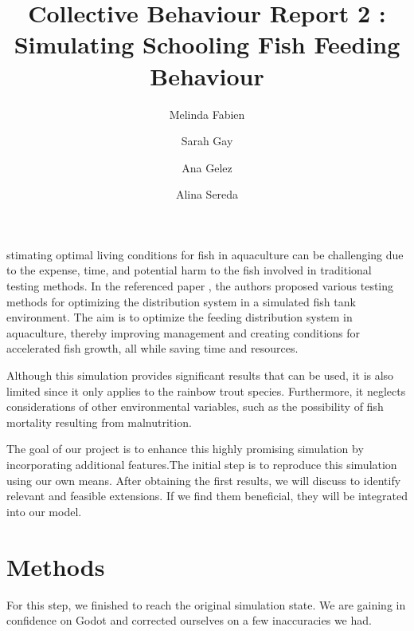 \documentclass[9pt]{pnas-new}
\title{Collective Behaviour Report 2 : Simulating Schooling Fish Feeding Behaviour}
\author{Melinda Fabien}
\author{Sarah Gay}
\author{Ana Gelez}
\author{Alina Sereda}
\affil{Collective behaviour course research seminar report}
\begin{document}
\verticaladjustment{-2pt}

\maketitle
\thispagestyle{firststyle}

stimating optimal living conditions for fish in aquaculture can be challenging due to the expense, time, and potential harm to the fish involved in traditional testing methods. In the referenced paper \cite{article}, the authors proposed various testing methods for optimizing the distribution system in a simulated fish tank environment. The aim is to optimize the feeding distribution system in aquaculture, thereby improving management and creating conditions for accelerated fish growth, all while saving time and resources. 

Although this simulation provides significant results that can be used, it is also limited since it only applies to the rainbow trout species.  Furthermore, it neglects considerations of other environmental variables, such as the possibility of fish mortality resulting from malnutrition. 

The goal of our project is to enhance this highly promising simulation by incorporating additional features.The initial step is to reproduce this simulation using our own means. After obtaining the first results, we will discuss to identify relevant and feasible extensions. If we find them beneficial, they will be integrated into our model.

\section*{Methods}

For this step, we finished to reach the original simulation state. We are gaining in confidence on Godot and corrected ourselves on a few inaccuracies we had.
\end{document}
